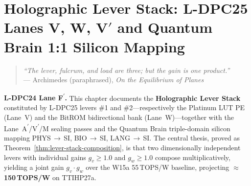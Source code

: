

\chapter{Holographic Lever Stack: L-DPC25 Lanes V, W, V\texorpdfstring{$'$}{prime} and Quantum Brain 1:1 Silicon Mapping}
\label{ch:flos-77}

\begin{quotation}
  \noindent
  \textit{``The lever, fulcrum, and load are three; but the gain is one product.''}\\
  \hfill --- Archimedes (paraphrased), \textit{On the Equilibrium of Planes}
\end{quotation}

\noindent
\textbf{L-DPC24 Lane F\textsuperscript{$\prime$}.} \quad
This chapter documents the \textbf{Holographic Lever Stack} constituted by
L-DPC25 levers \#1 and \#2---respectively the Platinum LUT PE (Lane~V) and
the BitROM bidirectional bank (Lane~W)---together with the Lane~A\textsuperscript{$\prime$}/V\textsuperscript{$\prime$}/M
sealing passes and the Quantum Brain triple-domain silicon mapping
PHYS\,$\to$\,SI, BIO\,$\to$\,SI, LANG\,$\to$\,SI.
The central thesis, proved as Theorem~\ref{thm:lever-stack-composition}, is that
two dimensionally independent levers with individual gains
$g_v \geq 1.0$ and $g_w \geq 1.0$ compose multiplicatively, yielding a joint gain
$g_v \cdot g_w$ over the W15a 55\,TOPS/W baseline,
projecting \textbf{$\approx$150\,TOPS/W} on TTIHP27a.

